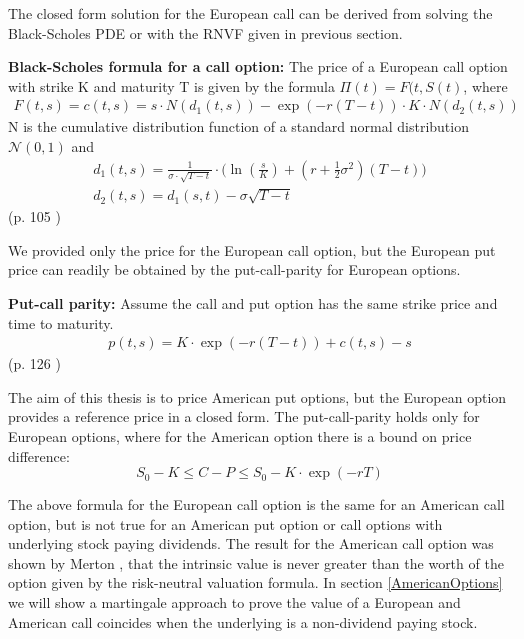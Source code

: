 The closed form solution for the European call can be derived from solving the Black-Scholes PDE or with the RNVF given in previous section. 
\theoremstyle{proposition}
\begin{proposition}{}\label{BS-price-EuroCall}
\textbf{Black-Scholes formula for a call option: } The price of a European call option with strike K and maturity T is given by the formula  $\Pi(t)=F(t,S(t)$, where
\begin{align*}
F(t,s)=c(t,s)=s \cdot N(d_1(t,s)) - \exp(-r(T-t)) \cdot K \cdot N(d_2(t,s))
\end{align*}
N is the cumulative distribution function of a standard normal distribution $\mathcal{N}(0,1)$ and
\begin{align*}
d_1(t,s)=\frac{1}{\sigma\cdot \sqrt{T-t}} \cdot \bigg( \ln(\frac{s}{K}) + (r+\frac{1}{2} \sigma^2) (T-t) \bigg)\\
d_2(t,s)=d_1(s,t)-\sigma \sqrt{T-t}
\end{align*}
\null \hfill (p. 105 \parencite{finKont})
\end{proposition}
We provided only the price for the European call option, but the European put price can readily be obtained by the put-call-parity for European options.

\theoremstyle{proposition}
\begin{proposition}{}\label{put-call-parity}
\textbf{Put-call parity: } 
Assume the call and put option has the same strike price and time to maturity.
\begin{align*}
p(t,s)=K\cdot \exp(-r(T-t))+c(t,s)-s
\end{align*}
\null \hfill (p. 126 \parencite{finKont})
\end{proposition}

The aim of this thesis is to price American put options, but the European option provides a reference price in a closed form. The put-call-parity holds only for European options, where for the American option there is a bound on price difference:
$$S_0 - K \leq C-P \leq S_0 - K \cdot \exp(-rT)$$

The above formula for the European call option is the same for an American call option, but is not true for an American put option or call options with underlying stock paying dividends. The result for the American call option was shown by Merton \parencite{Merton73}, that the intrinsic value is never greater than the worth of the option given by the risk-neutral valuation formula. In section \ref{AmericanOptions} we will show a martingale approach to prove the value of a European and American call coincides when the underlying is a non-dividend paying stock.

